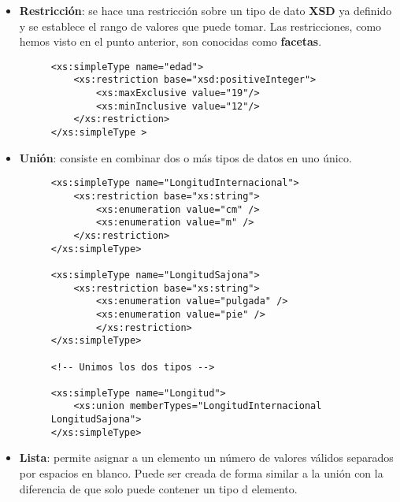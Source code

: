 \begin{itemize}
    \item \textbf{Restricción}: se hace una restricción sobre un tipo de dato \textbf{XSD} ya definido y se establece el rango de valores que puede tomar. Las restricciones, como hemos visto en el punto anterior, son conocidas como \textbf{facetas}.

    \begin{figure}[h]
        \begin{tcolorbox}[sharp corners, colback=yellow!30, colframe=white!20]
            \scriptsize
            \begin{verbatim}
<xs:simpleType name="edad">
    <xs:restriction base="xsd:positiveInteger">
        <xs:maxExclusive value="19"/>
        <xs:minInclusive value="12"/>
    </xs:restriction>
</xs:simpleType >
            \end{verbatim}
        \end{tcolorbox}
    \end{figure}

    \item \textbf{Unión}: consiste en combinar dos o más tipos de datos en uno único.

    \begin{figure}[h]
        \begin{tcolorbox}[sharp corners, colback=yellow!30, colframe=white!20]
            \scriptsize
            \begin{verbatim}
<xs:simpleType name="LongitudInternacional">
    <xs:restriction base="xs:string">
        <xs:enumeration value="cm" />
        <xs:enumeration value="m" />
    </xs:restriction>
</xs:simpleType>

<xs:simpleType name="LongitudSajona">
    <xs:restriction base="xs:string">
        <xs:enumeration value="pulgada" />
        <xs:enumeration value="pie" />
        </xs:restriction>
</xs:simpleType>

<!-- Unimos los dos tipos -->

<xs:simpleType name="Longitud">
    <xs:union memberTypes="LongitudInternacional  LongitudSajona">
</xs:simpleType>
            \end{verbatim}
        \end{tcolorbox}
    \end{figure}

    \item \textbf{Lista}: permite asignar a un elemento un número de valores válidos separados por espacios en blanco. Puede ser creada de forma similar a la unión con la diferencia de que solo puede contener un tipo d elemento.


\end{itemize}
